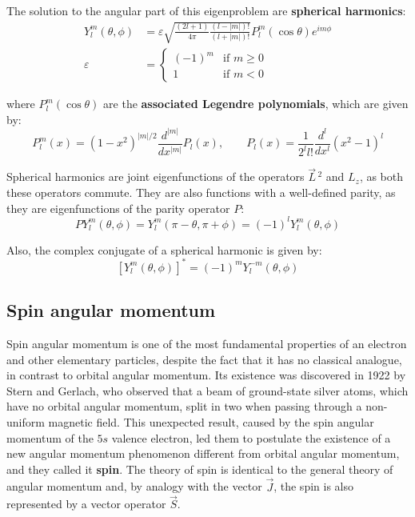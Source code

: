 The solution to the angular part of this eigenproblem are \textbf{spherical harmonics}:
\begin{equation}
    \begin{split}
        Y_l^m(\theta, \phi) &= \varepsilon\sqrt{\frac{(2l+1)}{4\pi}\frac{(l-|m|)!}{(l+|m|)!}}P_l^m(\cos\theta)e^{im\phi} \\
        \varepsilon &= \begin{cases}
            (-1)^m & \text{if } m \geq 0 \\
            1 & \text{if } m < 0
        \end{cases}
    \end{split}
\end{equation}

where $P_l^m(\cos\theta)$ are the \textbf{associated Legendre polynomials}, which are given by:
\begin{equation}
    P_l^m(x) = (1-x^2)^{|m|/2}\frac{d^{|m|}}{dx^{|m|}}P_l(x), \qquad P_l(x) = \frac{1}{2^ll!}\frac{d^l}{dx^l}(x^2-1)^l
\end{equation}

Spherical harmonics are joint eigenfunctions of the operators $\vec{L}\,^2$ and $L_z$, as both these operators commute. They are also functions with a well-defined parity, as they are eigenfunctions of the parity operator $P$:
\begin{equation}
    PY_l^m(\theta, \phi) = Y_l^m(\pi-\theta, \pi+\phi) = (-1)^lY_l^m(\theta, \phi)
\end{equation}

Also, the complex conjugate of a spherical harmonic is given by:
\begin{equation}
    \left[Y_l^{m}(\theta, \phi)\right]^* = (-1)^mY_l^{-m}(\theta, \phi)
\end{equation}

\subsection{Spin angular momentum} \label{spin}

Spin angular momentum is one of the most fundamental properties of an electron and other elementary particles, despite the fact that it has no classical analogue, in contrast to orbital angular momentum. Its existence was discovered in 1922 by Stern and Gerlach, who observed that a beam of ground-state silver atoms, which have no orbital angular momentum, split in two when passing through a non-uniform magnetic field. This unexpected result, caused by the spin angular momentum of the $5s$ valence electron, led them to postulate the existence of a new angular momentum phenomenon different from orbital angular momentum, and they called it \textbf{spin}. The theory of spin is identical to the general theory of angular momentum and, by analogy with the vector $\vec{J}$, the spin is also represented by a vector operator $\vec{S}$.

